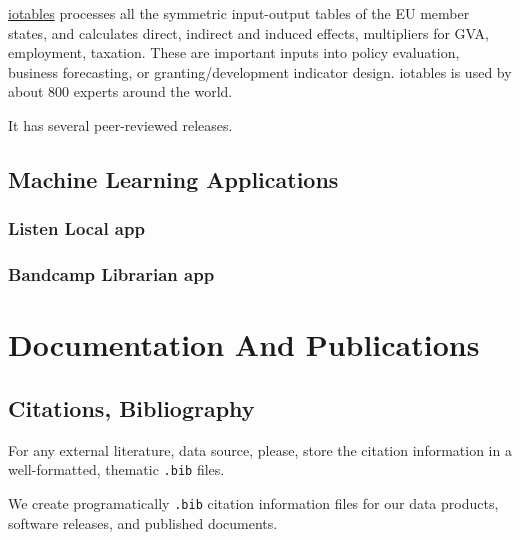 \documentclass[
  fontsize=13pt,
  english,
  a4paper,
  openany, a4paper, oneside]{book}
\begin{document}
\href{https://reprex.nl/software/iotables/}{iotables} processes all the symmetric input-output tables of the EU member states, and calculates direct, indirect and induced effects, multipliers for GVA, employment, taxation. These are important inputs into policy evaluation, business forecasting, or granting/development indicator design. iotables is used by about 800 experts around the world. \citep{R-iotables}

It has several peer-reviewed releases.

\hypertarget{machine-learning}{%
\section{Machine Learning Applications}\label{machine-learning}}

\hypertarget{listen-local-app}{%
\subsection{Listen Local app}\label{listen-local-app}}

\hypertarget{bandcamp-librarian-app}{%
\subsection{Bandcamp Librarian app}\label{bandcamp-librarian-app}}

\hypertarget{documentation}{%
\chapter{Documentation And Publications}\label{documentation}}

\hypertarget{bibliography}{%
\section{Citations, Bibliography}\label{bibliography}}

For any external literature, data source, please, store the citation information in a well-formatted, thematic \texttt{.bib} files.

We create programatically \texttt{.bib} citation information files for our data products, software releases, and published documents.
\end{document}
